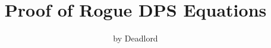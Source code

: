 \documentclass[12pt]{article}
\begin{document}
\title{Proof of Rogue DPS Equations}
\author{by Deadlord}
\date{}

\maketitle



\newpage
\end{document}
